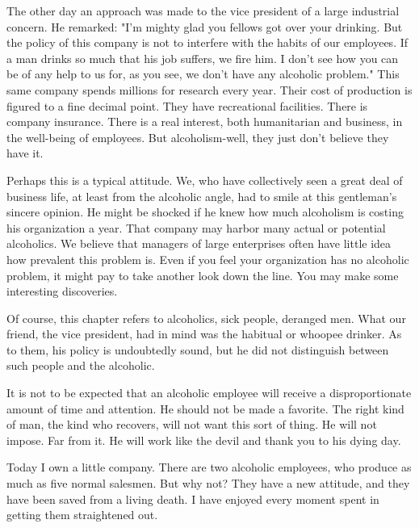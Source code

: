 \begin{biblechapter}
The other day an approach was made to the vice president of a large industrial concern.  He remarked:  "I'm mighty glad you fellows got over your drinking.  But the policy of this company is not to interfere with the habits of our employees.  If a man drinks so much that his job suffers, we fire him.  I don't see how you can be of any help to us for, as you see, we don't have any alcoholic problem."  This same company spends millions for research every year.  Their cost of production is figured to a fine decimal point.  They have recreational facilities.  There is company insurance.  There is a real interest, both humanitarian and business, in the well-being of employees.  But alcoholism-well, they just don't believe they have it.

Perhaps this is a typical attitude.  We, who have collectively seen a great deal of business life, at least from the alcoholic angle, had to smile at this gentleman's sincere opinion.  He might be shocked if he knew how much alcoholism is costing his organization a year.  That company may harbor many actual or potential alcoholics.  We believe that managers of large enterprises often have little idea how prevalent this problem is.  Even if you feel your organization has no alcoholic problem, it might pay to take another look down the line.  You may make some interesting discoveries.

Of course, this chapter refers to alcoholics, sick people, deranged men.  What our friend, the vice president, had in mind was the habitual or whoopee drinker.  As to them, his policy is undoubtedly sound, but he did not distinguish between such people and the alcoholic.

It is not to be expected that an alcoholic employee will receive a disproportionate amount of time and attention.  He should not be made a favorite.  The right kind of man, the kind who recovers, will not want this sort of thing.  He will not impose.  Far from it.  He will work like the devil and thank you to his dying day.

Today I own a little company.  There are two alcoholic employees, who produce as much as five normal salesmen.  But why not?  They have a new attitude, and they have been saved from a living death.  I have enjoyed every moment spent in getting them straightened out.

\end{biblechapter}
